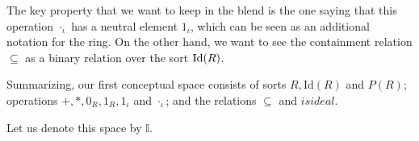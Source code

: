 The key property that
we want to keep in the blend is the one saying that 
this operation $\cdot_{\iota}$
has a neutral element $1_{\iota}$, which can be seen as an additional
notation for the ring.
%
On the other hand, we want to see the containment relation $\subseteq$
as a binary relation over the sort ${\rm Id}(R)$.

Summarizing, our first conceptual space consists of sorts $R,
\textrm{Id}(R)$ and $P(R)$; operations $+, *, 0_R, 1_R, 1_{\iota}$ and
$ \cdot_{\iota}$; and the relations $\subseteq$ and $isideal$.



 
Let us denote this space by $\mathbb{I}$.

